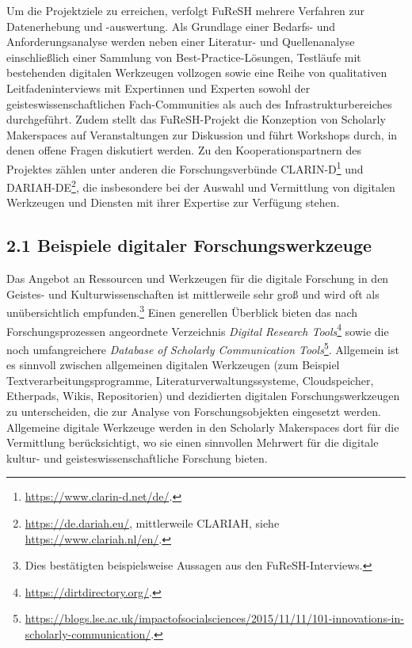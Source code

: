 \documentclass[a4paper,
fontsize=11pt,
oneside,
numbers=noperiodatend,
parskip=half-,
bibliography=totoc,
final
]{scrartcl}
\begin{document}
Um die Projektziele zu erreichen, verfolgt FuReSH mehrere Verfahren zur
Datenerhebung und -auswertung. Als Grundlage einer Bedarfs- und
Anforderungsanalyse werden neben einer Lite\-ra\-tur- und Quellenanalyse
einschließlich einer Sammlung von Best-Practice-Lösungen, Testläufe mit
bestehenden digitalen Werkzeugen vollzogen sowie eine Reihe von
qualitativen Leitfadeninterviews mit Expertinnen und Experten sowohl der
geisteswissenschaftlichen Fach-Commu\-nities als auch des
Infrastrukturbereiches durchgeführt. Zudem stellt das FuReSH-Projekt die
Konzeption von Scholarly Makerspaces auf Veranstaltungen zur Diskussion
und führt Workshops durch, in denen offene Fragen diskutiert werden. Zu
den Kooperationspartnern des Projektes zählen unter anderen die
Forschungsverbünde CLARIN-D\footnote{\url{https://www.clarin-d.net/de/}.}
und DARIAH-DE\footnote{\url{https://de.dariah.eu/}, mittlerweile
  CLARIAH, siehe \url{https://www.clariah.nl/en/}.}, die insbesondere
bei der Auswahl und Vermittlung von digitalen Werkzeugen und Diensten
mit ihrer Expertise zur Verfügung stehen.

\hypertarget{beispiele-digitaler-forschungswerkzeuge}{%
\subsection{2.1 Beispiele digitaler
Forschungswerkzeuge}\label{beispiele-digitaler-forschungswerkzeuge}}

Das Angebot an Ressourcen und Werkzeugen für die digitale Forschung in
den Geistes- und Kulturwissenschaften ist mittlerweile sehr groß und
wird oft als unübersichtlich empfunden.\footnote{Dies bestätigten
  beispielsweise Aussagen aus den FuReSH-Interviews.} Einen generellen
Überblick bieten das nach Forschungsprozessen angeordnete Verzeichnis
\emph{Digital Research Tools}\footnote{\url{https://dirtdirectory.org/}.}
sowie die noch umfangreichere \emph{Database of Scholarly Communication
Tools}\footnote{\url{https://blogs.lse.ac.uk/impactofsocialsciences/2015/11/11/101-innovations-in-scholarly-communication/}.}.
Allgemein ist es sinnvoll zwischen allgemeinen digitalen Werkzeugen (zum
Beispiel Textverarbeitungsprogramme, Literaturverwaltungssysteme,
Cloudspeicher, Etherpads, Wikis, Repositorien) und dezidierten digitalen
Forschungswerkzeugen zu unterscheiden, die zur Analyse von
Forschungsobjekten eingesetzt werden. Allgemeine digitale Werkzeuge
werden in den Scholarly Makerspaces dort für die Vermittlung
berücksichtigt, wo sie einen sinnvollen Mehrwert für die digitale
kultur- und geisteswissenschaftliche Forschung bieten.
\end{document}
